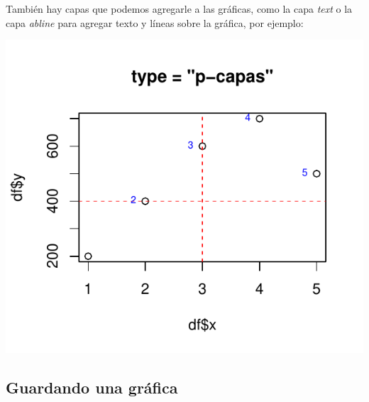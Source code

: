 \documentclass[
]{book}
\newenvironment{Shaded}{\begin{snugshade}}{\end{snugshade}}
\newcommand{\AttributeTok}[1]{\textcolor[rgb]{0.13,0.29,0.53}{#1}}
\newcommand{\DecValTok}[1]{\textcolor[rgb]{0.00,0.00,0.81}{#1}}
\newcommand{\FloatTok}[1]{\textcolor[rgb]{0.00,0.00,0.81}{#1}}
\newcommand{\FunctionTok}[1]{\textcolor[rgb]{0.13,0.29,0.53}{\textbf{#1}}}
\newcommand{\NormalTok}[1]{#1}
\newcommand{\SpecialCharTok}[1]{\textcolor[rgb]{0.81,0.36,0.00}{\textbf{#1}}}
\newcommand{\StringTok}[1]{\textcolor[rgb]{0.31,0.60,0.02}{#1}}
\begin{document}
También hay capas que podemos agregarle a las gráficas, como la capa \emph{text} o la capa \emph{abline} para agregar texto y líneas sobre la gráfica, por ejemplo:

\begin{Shaded}
\end{Shaded}

\begin{center}\includegraphics{R_Manual_files/figure-latex/unnamed-chunk-200-1} \end{center}

\subsection{Guardando una gráfica}\label{guardando-una-gruxe1fica}
\end{document}
